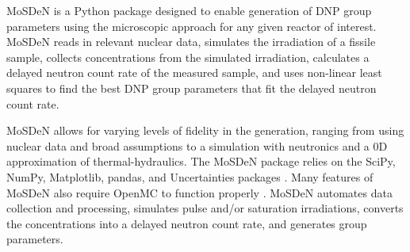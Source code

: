 \Gls{MoSDeN} is a Python package designed to enable generation of \gls{DNP} group parameters using the microscopic approach for any given reactor of interest.
\Gls{MoSDeN} reads in relevant nuclear data, simulates the irradiation of a fissile sample, collects concentrations from the simulated irradiation, calculates a delayed neutron count rate of the measured sample, and uses non-linear least squares to find the best \gls{DNP} group parameters that fit the delayed neutron count rate.

\gls{MoSDeN} allows for varying levels of fidelity in the generation, ranging from using nuclear data and broad assumptions to a simulation with neutronics and a 0D approximation of thermal-hydraulics.
The \gls{MoSDeN} package relies on the SciPy, NumPy, Matplotlib, pandas, and Uncertainties packages \cite{scipy, numpy, matplotlib, pandas, uncertaintiespackage}.
Many features of \gls{MoSDeN} also require OpenMC to function properly \cite{romano_openmc_2015}.
\gls{MoSDeN} automates data collection and processing, simulates pulse and/or saturation irradiations, converts the concentrations into a delayed neutron count rate, and generates group parameters.

